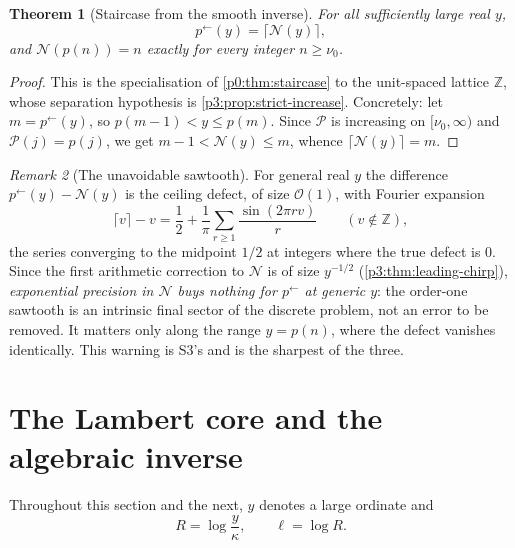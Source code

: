 \documentclass[11pt,a4paper,oneside]{book}
\theoremstyle{plain}
\newtheorem{theorem}{Theorem}[chapter]
\theoremstyle{definition}
\theoremstyle{remark}
\newtheorem{remark}[theorem]{Remark}
\newcommand{\Int}{\mathbb{Z}}
\newcommand{\bigO}{\mathcal{O}}
\begin{document}
\begin{theorem}[Staircase from the smooth inverse]\label{p3:thm:staircase}
For all sufficiently large real $y$,
\begin{equation}\label{p3:eq:staircase}
 p^{\leftarrow}(y)=\bigl\lceil\mathcal{N}(y)\bigr\rceil,
\end{equation}
and $\mathcal{N}(p(n))=n$ exactly for every integer $n\ge\nu_{0}$.
\end{theorem}

\begin{proof}
This is the specialisation of \cref{p0:thm:staircase} to the unit-spaced lattice $\Int$, whose
separation hypothesis is \cref{p3:prop:strict-increase}. Concretely: let $m=p^{\leftarrow}(y)$, so
$p(m-1)<y\le p(m)$. Since $\mathcal{P}$ is increasing on $[\nu_{0},\infty)$ and
$\mathcal{P}(j)=p(j)$, we get $m-1<\mathcal{N}(y)\le m$, whence $\lceil\mathcal{N}(y)\rceil=m$.
\end{proof}

\begin{remark}[The unavoidable sawtooth]\label{p3:rem:sawtooth}
For general real $y$ the difference $p^{\leftarrow}(y)-\mathcal{N}(y)$ is the ceiling defect, of
size $\bigO(1)$, with Fourier expansion
\begin{equation}\label{p3:eq:ceiling-fourier}
 \lceil v\rceil-v=\frac12+\frac1\pi\sum_{r\ge1}\frac{\sin(2\pi rv)}{r}
 \qquad (v\notin\Int),
\end{equation}
the series converging to the midpoint $1/2$ at integers where the true defect is $0$. Since the
first arithmetic correction to $\mathcal{N}$ is of size $y^{-1/2}$ (\cref{p3:thm:leading-chirp}),
\emph{exponential precision in $\mathcal{N}$ buys nothing for $p^{\leftarrow}$ at generic $y$}:
the order-one sawtooth is an intrinsic final sector of the discrete problem, not an error to be
removed. It matters only along the range $y=p(n)$, where the defect vanishes identically. This
warning is S3's and is the sharpest of the three.
\end{remark}

\section{The Lambert core and the algebraic inverse}\label{p3:sec:lambert}

Throughout this section and the next, $y$ denotes a large ordinate and
\begin{equation}\label{p3:eq:R-ell}
 R=\log\frac y\kappa,\qquad \ell=\log R .
\end{equation}
\end{document}
